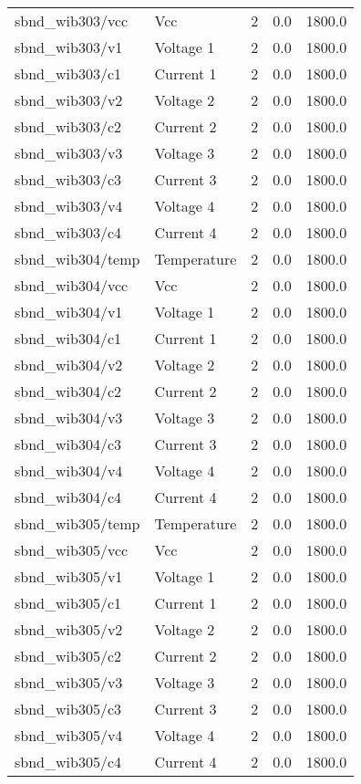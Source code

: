 \begin{center}
\begin{longtable}{l | l l l l }
sbnd\_wib303/vcc & Vcc & 2 & 0.0 & 1800.0\\ 
sbnd\_wib303/v1 & Voltage 1 & 2 & 0.0 & 1800.0\\ 
sbnd\_wib303/c1 & Current 1 & 2 & 0.0 & 1800.0\\ 
sbnd\_wib303/v2 & Voltage 2 & 2 & 0.0 & 1800.0\\ 
sbnd\_wib303/c2 & Current 2 & 2 & 0.0 & 1800.0\\ 
sbnd\_wib303/v3 & Voltage 3 & 2 & 0.0 & 1800.0\\ 
sbnd\_wib303/c3 & Current 3 & 2 & 0.0 & 1800.0\\ 
sbnd\_wib303/v4 & Voltage 4 & 2 & 0.0 & 1800.0\\ 
sbnd\_wib303/c4 & Current 4 & 2 & 0.0 & 1800.0\\ 
sbnd\_wib304/temp & Temperature & 2 & 0.0 & 1800.0\\ 
sbnd\_wib304/vcc & Vcc & 2 & 0.0 & 1800.0\\ 
sbnd\_wib304/v1 & Voltage 1 & 2 & 0.0 & 1800.0\\ 
sbnd\_wib304/c1 & Current 1 & 2 & 0.0 & 1800.0\\ 
sbnd\_wib304/v2 & Voltage 2 & 2 & 0.0 & 1800.0\\ 
sbnd\_wib304/c2 & Current 2 & 2 & 0.0 & 1800.0\\ 
sbnd\_wib304/v3 & Voltage 3 & 2 & 0.0 & 1800.0\\ 
sbnd\_wib304/c3 & Current 3 & 2 & 0.0 & 1800.0\\ 
sbnd\_wib304/v4 & Voltage 4 & 2 & 0.0 & 1800.0\\ 
sbnd\_wib304/c4 & Current 4 & 2 & 0.0 & 1800.0\\ 
sbnd\_wib305/temp & Temperature & 2 & 0.0 & 1800.0\\ 
sbnd\_wib305/vcc & Vcc & 2 & 0.0 & 1800.0\\ 
sbnd\_wib305/v1 & Voltage 1 & 2 & 0.0 & 1800.0\\ 
sbnd\_wib305/c1 & Current 1 & 2 & 0.0 & 1800.0\\ 
sbnd\_wib305/v2 & Voltage 2 & 2 & 0.0 & 1800.0\\ 
sbnd\_wib305/c2 & Current 2 & 2 & 0.0 & 1800.0\\ 
sbnd\_wib305/v3 & Voltage 3 & 2 & 0.0 & 1800.0\\ 
sbnd\_wib305/c3 & Current 3 & 2 & 0.0 & 1800.0\\ 
sbnd\_wib305/v4 & Voltage 4 & 2 & 0.0 & 1800.0\\ 
sbnd\_wib305/c4 & Current 4 & 2 & 0.0 & 1800.0\\ 

\end{longtable}
\end{center}
